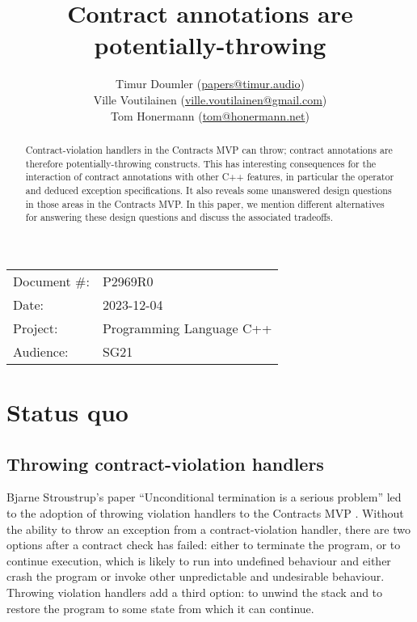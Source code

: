 


\title{Contract annotations are potentially-throwing}
\author{ Timur Doumler \small(\href{mailto:papers@timur.audio}{papers@timur.audio}) \\
Ville Voutilainen \small(\href{mailto:ville.voutilainen@gmail.com}{ville.voutilainen@gmail.com}) \\
Tom Honermann \small(\href{mailto:tom@honermann.net}{tom@honermann.net})
}
\date{}
\maketitle


\begin{tabular}{ll}
Document \#: & P2969R0 \\
Date: &2023-12-04 \\
Project: & Programming Language C++ \\
Audience: & SG21
\end{tabular}

\begin{abstract}
Contract-violation handlers in the Contracts MVP can throw; contract annotations are therefore potentially-throwing constructs. This has interesting consequences for the interaction of contract annotations with other C++ features, in particular the  operator and deduced exception specifications. It also reveals some unanswered design questions in those areas in the Contracts MVP. In this paper, we mention different alternatives for answering these design questions and discuss the associated tradeoffs.
\end{abstract}



\section{Status quo}
\subsection{Throwing contract-violation handlers}

Bjarne Stroustrup's paper ``Unconditional termination is a serious problem'' \cite{P2698R0} led to the adoption of throwing violation handlers to the Contracts MVP \cite{P2900R1}. Without the ability to throw an exception from a contract-violation handler, there are two options after a contract check has failed: either to terminate the program, or to continue execution, which is likely to run into undefined behaviour and either crash the program or invoke other unpredictable and undesirable behaviour. Throwing violation handlers add a third option: to unwind the stack and to restore the program to some state from which it can continue.


